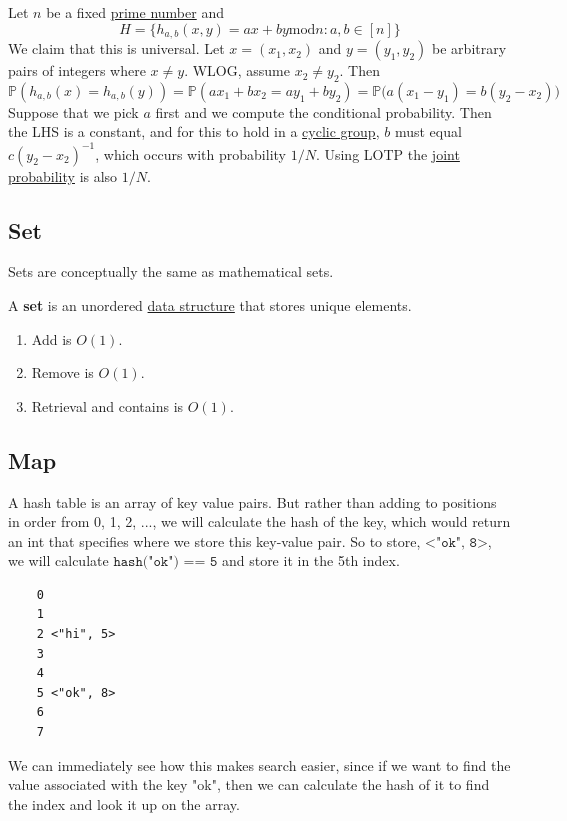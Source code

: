   \begin{example}
    \label{ex:a-universal-family-of-hash-functions}
    Let $n$ be a fixed \hyperref[nt-def:prime-number]{prime number} and 
    \begin{equation}
      H = \{h_{a, b} (x, y) = ax + by \mathrm{ mod } n : a, b \in [n] \}
    \end{equation} 
    We claim that this is universal. Let $x = (x_1, x_2)$ and $y = (y_1, y_2)$ be arbitrary pairs of integers where $x \neq y$. WLOG, assume $x_2 \neq y_2$. Then 
    \begin{equation}
      \mathbb{P}(h_{a, b} (x) = h_{a, b} (y)) = \mathbb{P}(a x_1 + b x_2 = a y_1 + b y_2) = \mathbb{P}\big( a (x_1 - y_1) = b (y_2 - x_2) \big)
    \end{equation} 
    Suppose that we pick $a$ first and we compute the conditional probability. Then the LHS is a constant, and for this to hold in a \hyperref[alg-def:cyclic-group]{cyclic group}, $b$ must equal $c (y_2 - x_2)^{-1}$, which occurs with probability $1/N$. Using LOTP the \hyperref[prob-def:joint-probability-law]{joint probability} is also $1/N$. 
  \end{example}

\subsection{Set} 

  Sets are conceptually the same as mathematical sets. 

  \begin{definition}[Set]
    \label{def:set}
    A \textbf{set} is an unordered \hyperref[def:data-structure]{data structure} that stores unique elements. 
    \begin{enumerate}
      \item Add is $O(1)$. 
      \item Remove is $O(1)$. 
      \item Retrieval and contains is $O(1)$. 
    \end{enumerate}
  \end{definition}

\subsection{Map} 

  A hash table is an array of key value pairs. But rather than adding to positions in order from 0, 1, 2, ..., we will calculate the hash of the key, which would return an int that specifies where we store this key-value pair. So to store, $\texttt{<"ok", 8>}$, we will calculate $\texttt{hash("ok") == 5}$ and store it in the 5th index.
  \begin{lstlisting}
    0 
    1 
    2 <"hi", 5>
    3 
    4 
    5 <"ok", 8>
    6 
    7 
  \end{lstlisting}
  We can immediately see how this makes search easier, since if we want to find the value associated with the key "ok", then we can calculate the hash of it to find the index and look it up on the array. 

